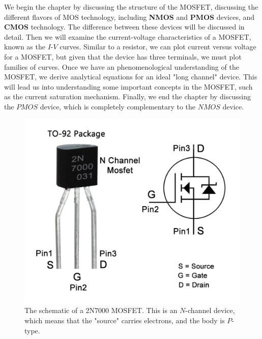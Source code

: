 We begin the chapter by discussing the structure of the MOSFET, discussing the different flavors of MOS technology, including \textbf{NMOS} and \textbf{PMOS} devices, and \textbf{CMOS} technology.  The difference between these devices will be discussed in detail.  Then we will examine the current-voltage characteristics of a MOSFET, known as the $I$-$V$ curves.  Similar to a resistor, we can plot current versus voltage for a MOSFET, but given that the device has three terminals, we must plot families of curves.  Once we have an phenomenological understanding of the MOSFET, we derive analytical equations for an ideal "long channel" device.  This will lead us into understanding some important concepts in the MOSFET, such as the current saturation mechanism.  Finally, we end the chapter by discussing the $PMOS$ device, which is completely complementary to the $NMOS$ device.
\begin{figure}[H]
\centering
\includegraphics[scale=0.25]{2n7000}
\caption{The schematic of a 2N7000 MOSFET.  This is an $N$-channel device, which means that the "source" carries electrons, and the body is $P$-type.}
\label{fig:ch08_intro}
\end{figure}
\newpage
